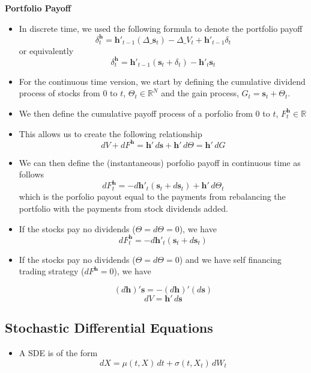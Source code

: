 \documentclass[11pt]{article}
\begin{document}
\textbf{Portfolio Payoff}
\begin{itemize}
    \item In discrete time, we used the following formula to denote the portfolio payoff 
    \[
    \delta_t^{\boldsymbol{h}} = \boldsymbol{h}'_{t-1}(\Delta\_\boldsymbol{s}_t) - \Delta \_ 
    V_t + \boldsymbol{h}'_{t-1} \delta_t
    \]
    or equivalently
    \[ \delta_t^{\boldsymbol{h}} = \boldsymbol{h}'_{t-1}(\boldsymbol{s}_t + \delta_t) - 
    \boldsymbol{h}'_{t}\boldsymbol{s}_t 
    \]
    \item For the continuous time version, we start by defining the cumulative dividend
    process of stocks from 0 to $t$, $\Theta_t \in \mathbb{R}^N$ and the gain process, $G_t =
    \boldsymbol{s}_t + \Theta_t$.
    \item We then define the cumulative payoff process of a porfolio from 0 to $t$, 
    $F_t^{\boldsymbol{h}} \in \mathbb{R}$
    \item This allows us to create the following relationship 
    \[ 
    dV + dF^{\boldsymbol{h}} = \boldsymbol{h}' \,d\boldsymbol{s} + \boldsymbol{h}'\,d\Theta = 
    \boldsymbol{h}'\,dG 
    \]
    \item We can then define the (instantaneous) porfolio payoff in continuous time as follows 
    \[
    dF_t^{\boldsymbol{h}} = -d\boldsymbol{h}'_t(\boldsymbol{s}_t + d\boldsymbol{s}_t) + 
    \boldsymbol{h}'\,d\Theta_t
    \]
    which is the porfolio payout equal to the payments from rebalancing the portfolio with the 
    payments from stock dividends added. 
    \item If the stocks pay no dividends ($\Theta = d\Theta = 0$), we have
    \[
        dF_t^{\boldsymbol{h}} = -d\boldsymbol{h}'_t(\boldsymbol{s}_t + d\boldsymbol{s}_t)
    \]
    \item If the stocks pay no dividends ($\Theta = d\Theta = 0$) and we have self financing 
    trading strategy ($dF^{\boldsymbol{h}}=0$), we have 

    \[ {(d\boldsymbol{h})}'\boldsymbol{s} = -{(d\boldsymbol{h})}'(d\boldsymbol{s}) \]
    \[ dV = \boldsymbol{h}'\,d\boldsymbol{s} \]
\end{itemize}

\subsection{Stochastic Differential Equations}
\begin{itemize}
    \item A SDE is of the form 
    \[dX = \mu(t,X)\,dt + \sigma(t, X_t) \,dW_t\]
\end{itemize}
\end{document}
